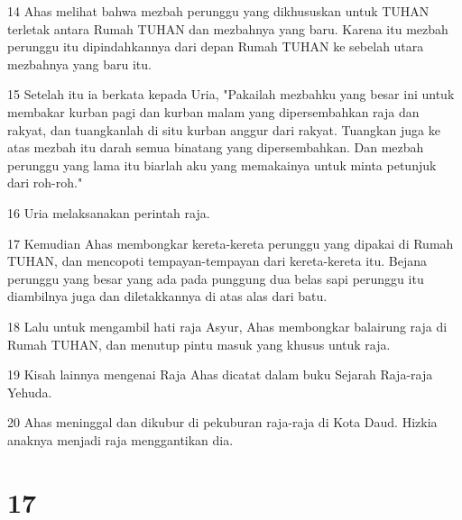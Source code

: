 \par 14 Ahas melihat bahwa mezbah perunggu yang dikhususkan untuk TUHAN terletak antara Rumah TUHAN dan mezbahnya yang baru. Karena itu mezbah perunggu itu dipindahkannya dari depan Rumah TUHAN ke sebelah utara mezbahnya yang baru itu.
\par 15 Setelah itu ia berkata kepada Uria, "Pakailah mezbahku yang besar ini untuk membakar kurban pagi dan kurban malam yang dipersembahkan raja dan rakyat, dan tuangkanlah di situ kurban anggur dari rakyat. Tuangkan juga ke atas mezbah itu darah semua binatang yang dipersembahkan. Dan mezbah perunggu yang lama itu biarlah aku yang memakainya untuk minta petunjuk dari roh-roh."
\par 16 Uria melaksanakan perintah raja.
\par 17 Kemudian Ahas membongkar kereta-kereta perunggu yang dipakai di Rumah TUHAN, dan mencopoti tempayan-tempayan dari kereta-kereta itu. Bejana perunggu yang besar yang ada pada punggung dua belas sapi perunggu itu diambilnya juga dan diletakkannya di atas alas dari batu.
\par 18 Lalu untuk mengambil hati raja Asyur, Ahas membongkar balairung raja di Rumah TUHAN, dan menutup pintu masuk yang khusus untuk raja.
\par 19 Kisah lainnya mengenai Raja Ahas dicatat dalam buku Sejarah Raja-raja Yehuda.
\par 20 Ahas meninggal dan dikubur di pekuburan raja-raja di Kota Daud. Hizkia anaknya menjadi raja menggantikan dia.

\chapter{17}

